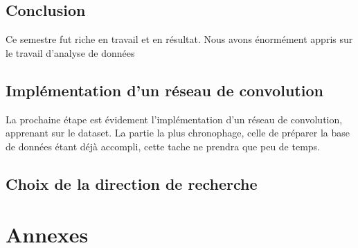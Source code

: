 \documentclass[a4paper, 12pt, titlepage, oneside, french]{article}
\begin{document}
	\subsection{Conclusion} %
	Ce semestre fut riche en travail et en résultat. Nous avons énormément appris sur le travail d'analyse de données
	\subsection{Implémentation d'un réseau de convolution}
	La prochaine étape est évidement l'implémentation d'un réseau de convolution, apprenant sur le dataset. La partie la plus chronophage, celle de préparer la base de données étant déjà accompli, cette tache ne prendra que peu de temps. 
	\subsection{Choix de la direction de recherche}

\newpage
\section{Annexes}

\medskip
\newpage
\printbibliography
\end{document}

